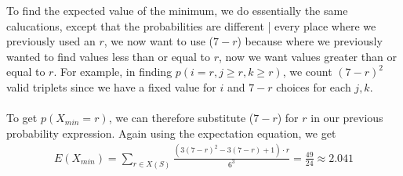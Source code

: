 \documentclass[a4paper]{article}
\begin{document}
\begin{enumerate}
To find the expected value of the minimum, we do essentially the same calucations, except that the probabilities are different | every place where we previously used an $r$, we now want to use ($7-r$) because where we previously wanted to find values less than or equal to $r$, now we want values greater than or equal to $r$. For example, in finding $p(i = r, j \geq r, k \geq r)$, we count $(7-r)^2$ valid triplets since we have a fixed value for $i$ and $7-r$ choices for each $j, k$. \\
\\
To get $p(X_{min} = r)$, we can therefore substitute ($7-r$) for $r$ in our previous probability expression. Again using the expectation equation, we get 
\begin{align}
\nonumber\displaystyle E(X_{min}) = \sum\limits_{r \in X(S)} \frac{(3(7-r)^2 - 3(7-r) + 1) \cdot r}{6^3} = \frac{49}{24} \approx 2.041
\end{align}
\\




\end{enumerate}
\end{document}
